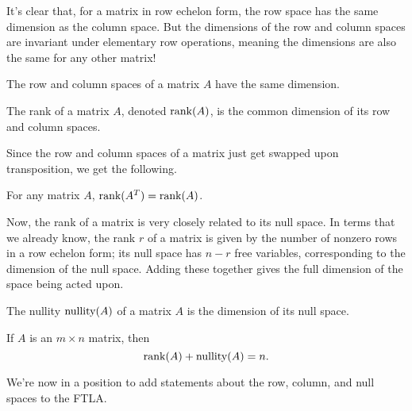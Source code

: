 \documentclass[../m073main.tex]{subfiles}
\begin{document}
It's clear that, for a matrix in row echelon form, the row space has the same dimension as the column space.
But the dimensions of the row and column spaces are invariant under elementary row operations, meaning the dimensions are also the same for any other matrix!

\begin{theorem}
	The row and column spaces of a matrix $A$ have the same dimension.
\end{theorem}

\begin{definition}[Rank]
	The rank of a matrix $A$, denoted $\textrm{rank}(A)$, is the common dimension of its row and column spaces.
\end{definition}

Since the row and column spaces of a matrix just get swapped upon transposition, we get the following.


\begin{theorem}
	For any matrix $A$, $\textrm{rank}(A^T) = \textrm{rank}(A)$.
\end{theorem}

Now, the rank of a matrix is very closely related to its null space.
In terms that we already know, the rank $r$ of a matrix is given by the number of nonzero rows in a row echelon form; its null space has $n-r$ free variables, corresponding to the dimension of the null space.
Adding these together gives the full dimension of the space being acted upon.

\begin{definition}[Nullity]
	The nullity $\textrm{nullity}(A)$ of a matrix $A$ is the dimension of its null space.
\end{definition}

\begin{theorem}
	If $A$ is an $m\times n$ matrix, then
	\[ \textrm{rank}(A) + \textrm{nullity}(A) = n. \]
\end{theorem}

We're now in a position to add statements about the row, column, and null spaces to the FTLA.
\end{document}
